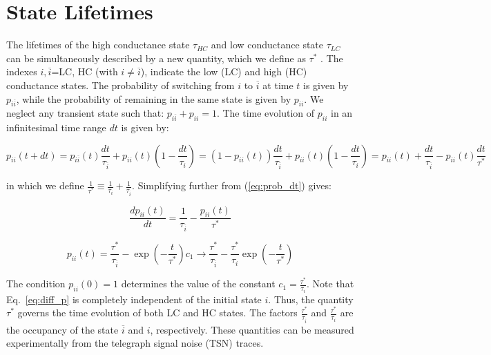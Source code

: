 \documentclass[reprint,amsmath,amssymb,aps,nofootinbib,onecolumn]{revtex4-2}
\begin{document}
\section{State Lifetimes}
The lifetimes of the high conductance state $\tau_{HC}$ and low conductance state $\tau_{LC}$ can be simultaneously described by a new quantity, which we define as $\tau^{*}$ \citep{Khajetoorians2013}. The indexes $i,\overline{i}$=LC, HC (with $i\neq \overline{i}$), indicate the low (LC) and high (HC) conductance states. The probability of switching from $ i$ to $\overline{i} $ at time $t$ is given by $ p_{i \overline{i}} $, while the probability of remaining in the same state is given by $ p_{ii} $. We neglect any transient state such that: $ p_{i\overline{i}} + p_{ii} = 1$. The time evolution of $ p_{ii} $ in an infinitesimal time range $dt$ is given by:

\begin{equation}
p_{ii}(t+dt)=p_{i\overline{i}}(t)\frac{dt}{\tau_{\overline{i}}}+p_{ii}(t)\left( 1-\frac{dt}{\tau_i} \right)=(1-p_{ii}(t))\frac{dt}{\tau_{\overline{i}}}+p_{ii}(t)\left( 1-\frac{dt}{\tau_i} \right)=p_{ii}(t)+\frac{dt}{\tau_{\overline{i}}}-p_{ii}(t)\frac{dt}{\tau^*}
\label{eq:prob_dt}
\end{equation}

in which we define $\frac{1}{\tau^*}\equiv\frac{1}{\tau_i}+\frac{1}{\tau_{\overline{i}}}$. Simplifying further from  (\ref{eq:prob_dt}) gives:

\begin{equation}
\frac{dp_{ii}(t)}{dt}=\frac{1}{\tau_{\overline{i}}}-\frac{p_{ii}(t)}{\tau^*}  
\label{eq:diff_p}
\end{equation}

\begin{equation}
p_{ii}(t)=\frac{\tau^*}{\tau_{\overline{i}}}-\exp(-\frac{t}{\tau^{*}})c_1\rightarrow\frac{\tau^{*}}{\tau_{\overline{i}}}-\frac{\tau^{*}}{\tau_i}\exp(-\frac{t}{\tau^*})
\label{eq:sol_diff}
\end{equation}

The condition $p_{ii}(0)=1$ determines the value of the constant $c_1=\frac{\tau^{*}}{\tau_i}$. Note that Eq.~\ref{eq:diff_p} is completely independent of the initial state $i$. Thus, the quantity $\tau^{*}$ governs the time evolution of both LC and HC states. The factors $\frac{\tau^{*}}{\tau_{\overline{i}}} $ and $ \frac{\tau^{*}}{\tau_{i}} $ are the occupancy of the state $\overline{i}$ and $i$, respectively. These quantities can be measured experimentally from the telegraph signal noise (TSN) traces.  
\end{document}
